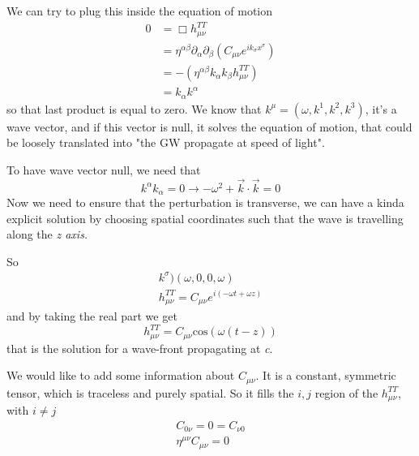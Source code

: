 We can try to plug this inside the equation of motion
\begin{align*}
	0 &= \Box h^{TT}_{\mu \nu }\\
	  &= \eta ^{\alpha \beta }\partial_{\alpha }\partial_{\beta }\left( C_{\mu \nu }e^{ik_{\sigma }x^{\sigma }} \right) \\
	  &= - \left( \eta ^{\alpha \beta }k_{\alpha }k_{\beta }h^{TT}_{\mu \nu } \right)\\
	  &= k_{\alpha }k^{\alpha }
\end{align*}
so that last product is equal to zero. We know that $k^{\mu } =\left( \omega , k^{1},k^{2},k^{3} \right)$, it's a wave vector, and if this vector is null, it solves the equation of motion, that could be loosely translated into "the GW propagate at speed of light".\par
To have wave vector null, we need that
\[
k^{\alpha }k_{\alpha } = 0 \to - \omega ^{2} + \vec{k}\cdot \vec{k}=0
\]
Now we need to ensure that the perturbation is transverse, we can have a kinda explicit solution by choosing spatial coordinates such that the wave is travelling along the \emph{z axis.}\par
So
\begin{align*}
k^{\sigma } ) \left( \omega , 0,0, \omega  \right)\\
h^{TT}_{\mu \nu } = C_{\mu \nu }e^{i\left( -\omega t +\omega z \right)} 
\end{align*}
and by taking the real part we get
\[
h^{TT}_{\mu \nu } = C_{\mu \nu } \text{cos}\left( \omega \left( t-z \right) \right)
\]
that is the solution for a wave-front propagating at \emph{c}.\par
We would like to add some information about $C_{\mu \nu }$. It is a constant, symmetric tensor, which is traceless and purely spatial. So it fills the $i,j$ region of the $h_{\mu \nu }^{TT}$, with $i\neq j$
\begin{gather*}
C_{0\nu } = 0 = C_{\nu 0} \\
\eta ^{\mu \nu }C_{\mu \nu } = 0
\end{gather*}

